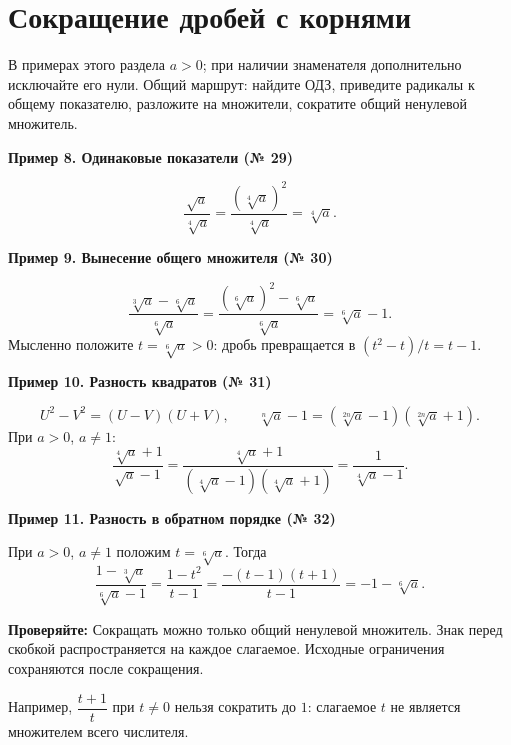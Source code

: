\documentclass[a4paper,12pt]{article}
\newcommand{\example}[1]{\par\medskip\textcolor{darkaccent}{\textbf{#1}}\par}
\newcommand{\remember}[1]{\par\smallskip\textcolor{darkaccent}{\textbf{Проверяйте:}} #1\par}
\begin{document}
\section{Сокращение дробей с корнями}
В примерах этого раздела $a>0$; при наличии знаменателя дополнительно исключайте его нули. Общий маршрут: найдите ОДЗ, приведите радикалы к общему показателю, разложите на множители, сократите общий ненулевой множитель.
\example{Пример 8. Одинаковые показатели (№ 29)}
\[
\frac{\sqrt a}{\sqrt[4]a}=
\frac{(\sqrt[4]a)^2}{\sqrt[4]a}=\sqrt[4]a.
\]
\example{Пример 9. Вынесение общего множителя (№ 30)}
\[
\frac{\sqrt[3]a-\sqrt[6]a}{\sqrt[6]a}=
\frac{(\sqrt[6]a)^2-\sqrt[6]a}{\sqrt[6]a}=
\sqrt[6]a-1.
\]
Мысленно положите $t=\sqrt[6]a>0$: дробь превращается в $(t^2-t)/t=t-1$.
\example{Пример 10. Разность квадратов (№ 31)}
\[
U^2-V^2=(U-V)(U+V),\qquad
\sqrt[n]a-1=(\sqrt[2n]a-1)(\sqrt[2n]a+1).
\]
При $a>0$, $a\ne1$:
\[
\frac{\sqrt[4]a+1}{\sqrt a-1}=
\frac{\sqrt[4]a+1}{(\sqrt[4]a-1)(\sqrt[4]a+1)}
=\frac1{\sqrt[4]a-1}.
\]
\example{Пример 11. Разность в обратном порядке (№ 32)}
При $a>0$, $a\ne1$ положим $t=\sqrt[6]a$. Тогда
\[
\frac{1-\sqrt[3]a}{\sqrt[6]a-1}=
\frac{1-t^2}{t-1}=\frac{-(t-1)(t+1)}{t-1}=-1-\sqrt[6]a.
\]
\remember{Сокращать можно только общий ненулевой множитель. Знак перед скобкой распространяется на каждое слагаемое. Исходные ограничения сохраняются после сокращения.}
\smallskip
Например, $\dfrac{t+1}{t}$ при $t\ne0$ нельзя сократить до $1$: слагаемое $t$ не является множителем всего числителя.
\clearpage
\end{document}

